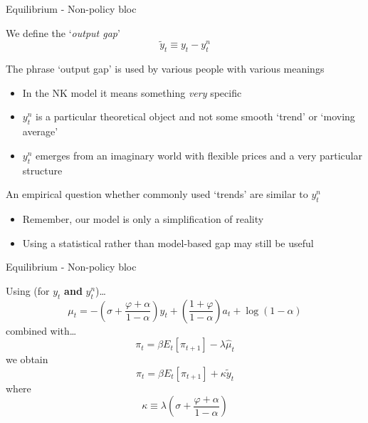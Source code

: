 \documentclass{beamer}
\begin{document}
	
\begin{frame}{Equilibrium - Non-policy bloc}

We define the `\emph{output gap}'
\[
\tilde{y}_{t}\equiv y_{t}-y^{n}_{t}
\]

The phrase `output gap' is used by various people with various meanings
\begin{itemize}
\item	In the NK model it means something \emph{very} specific
\item	$y^{n}_{t}$ is a particular theoretical object and not some smooth `trend' or `moving average'
\item	$y_{t}^{n}$ emerges from an imaginary world with flexible prices and a very particular structure
\end{itemize}

\vspace{2mm}
An empirical question whether commonly used `trends' are similar to $y^{n}_{t}$
\begin{itemize}
\item	Remember, our model is only a simplification of reality
\item	Using a statistical rather than model-based gap may still be useful
\end{itemize}

\end{frame}


	
\begin{frame}{Equilibrium - Non-policy bloc}

Using (for $y_{t}$ \textbf{and} $y^{n}_{t}$)\ldots
\[
\mu_{t} = - \left( \sigma + \frac{\varphi + \alpha}{1-\alpha} \right)y_{t} + \left( \frac{1+\varphi}{1-\alpha} \right)a_{t} + \log{(1-\alpha)}
\]
combined with\ldots
\[
\pi_{t} = \beta E_{t}[\pi_{t+1}] - \lambda \hat{\mu}_{t}
\]
we obtain
\begin{equation}
\pi_{t} = \beta E_{t}[\pi_{t+1}]  + \kappa \tilde{y}_{t} \label{eqn:nkpc}
\end{equation}
where
\[
\kappa \equiv \lambda \left(  \sigma + \frac{\varphi + \alpha}{1-\alpha} \right)
\]

\end{frame}

\end{document}
